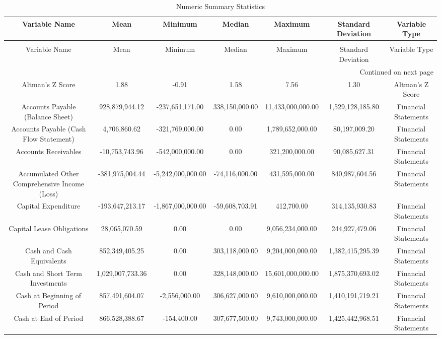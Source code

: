 \tiny
\begin{longtable}{ccccccc}
\caption{Numeric Summary Statistics} \label{tab:numeric_summary_statistics} \\
\toprule
Variable Name & Mean & Minimum & Median & Maximum & Standard Deviation & Variable Type \\
\midrule
\endfirsthead
\caption[]{Numeric Summary Statistics} \\
\toprule
Variable Name & Mean & Minimum & Median & Maximum & Standard Deviation & Variable Type \\
\midrule
\endhead
\midrule
\multicolumn{7}{r}{Continued on next page} \\
\midrule
\endfoot
\bottomrule
\endlastfoot
Altman's Z Score & 1.88 & -0.91 & 1.58 & 7.56 & 1.30 & Altman's Z Score \\
Accounts Payable (Balance Sheet) & 928,879,944.12 & -237,651,171.00 & 338,150,000.00 & 11,433,000,000.00 & 1,529,128,185.80 & Financial Statements \\
Accounts Payable (Cash Flow Statement) & 4,706,860.62 & -321,769,000.00 & 0.00 & 1,789,652,000.00 & 80,197,009.20 & Financial Statements \\
Accounts Receivables & -10,753,743.96 & -542,000,000.00 & 0.00 & 321,200,000.00 & 90,085,627.31 & Financial Statements \\
Accumulated Other Comprehensive Income (Loss) & -381,975,004.44 & -5,242,000,000.00 & -74,116,000.00 & 431,595,000.00 & 840,987,604.56 & Financial Statements \\
Capital Expenditure & -193,647,213.17 & -1,867,000,000.00 & -59,608,703.91 & 412,700.00 & 314,135,930.83 & Financial Statements \\
Capital Lease Obligations & 28,065,070.59 & 0.00 & 0.00 & 9,056,234,000.00 & 244,927,479.06 & Financial Statements \\
Cash and Cash Equivalents & 852,349,405.25 & 0.00 & 303,118,000.00 & 9,204,000,000.00 & 1,382,415,295.39 & Financial Statements \\
Cash and Short Term Investments & 1,029,007,733.36 & 0.00 & 328,148,000.00 & 15,601,000,000.00 & 1,875,370,693.02 & Financial Statements \\
Cash at Beginning of Period & 857,491,604.07 & -2,556,000.00 & 306,627,000.00 & 9,610,000,000.00 & 1,410,191,719.21 & Financial Statements \\
Cash at End of Period & 866,528,388.67 & -154,400.00 & 307,677,500.00 & 9,743,000,000.00 & 1,425,442,968.51 & Financial Statements \\

\end{longtable}
